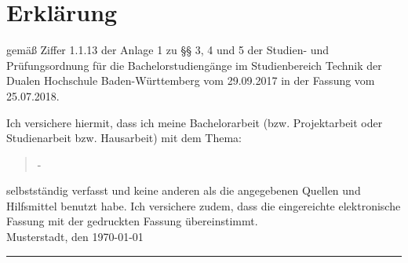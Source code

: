 %
%
%
%

\chapter*{Erklärung} %

gemäß Ziffer 1.1.13 der Anlage 1 zu §§ 3, 4 und 5  der Studien- und Prüfungsordnung für die Bachelorstudiengänge im Studienbereich Technik der Dualen Hochschule Baden-Württemberg vom 29.09.2017 in der Fassung vom 25.07.2018.

Ich versichere hiermit, dass ich meine Bachelorarbeit (bzw. Projektarbeit oder Studienarbeit bzw. Hausarbeit) mit dem Thema:

\begin{quote}
	\textit{\titel} -\textit{ \untertitel }
\end{quote}

selbstständig verfasst und keine anderen als die angegebenen Quellen und Hilfsmittel benutzt habe. Ich versichere zudem, dass die eingereichte elektronische Fassung mit der gedruckten Fassung übereinstimmt.\\[10ex]

Musterstadt, den \today \\[4ex]

\rule[-0.2cm]{5cm}{0.5pt} \\

\textsc{\autor} \\[10ex]

\cleardoublepage